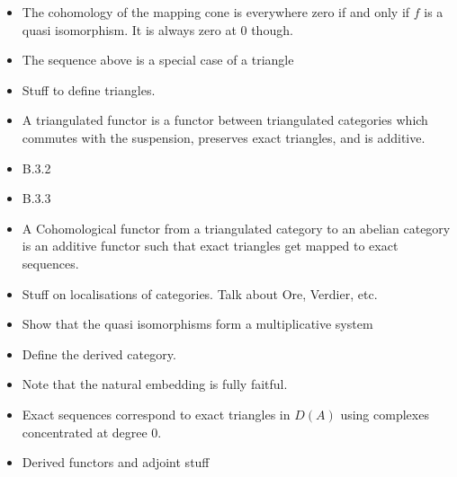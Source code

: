 \documentclass[a4paper]{article}
\begin{document}
\begin{itemize}
    \item The cohomology of the mapping cone is everywhere zero if and only if $f$ is a quasi isomorphism. It is always zero at $0$ though.
    \item The sequence above is a special case of a triangle
    \item Stuff to define triangles.
    \item A triangulated functor is a functor between triangulated categories which commutes with the suspension, preserves exact triangles, and is additive.
    \item B.3.2
    \item B.3.3
    \item A Cohomological functor from a triangulated category to an abelian category is an additive functor such that exact triangles get mapped to exact sequences.
    \item Stuff on localisations of categories. Talk about Ore, Verdier, etc.
    \item Show that the quasi isomorphisms form a multiplicative system
    \item Define the derived category.
    \item Note that the natural embedding is fully faitful.
    \item Exact sequences correspond to exact triangles in $D(A)$ using complexes concentrated at degree $0$.
    \item Derived functors and adjoint stuff
\end{itemize}
\end{document}
